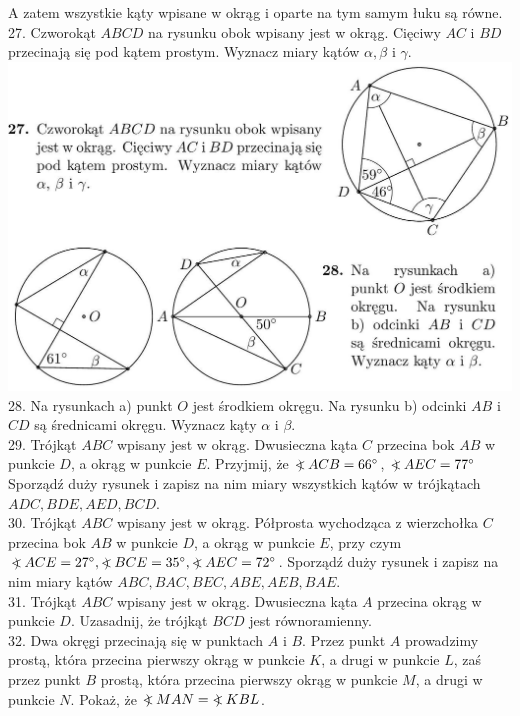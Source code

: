 \documentclass[10pt]{article}
\newcommand\Varangle{\mathop{{<\!\!\!\!\!\text{\small)}}\:}\nolimits}
\begin{document}
A zatem wszystkie kąty wpisane w okrąg i oparte na tym samym łuku są równe.\\
27. Czworokąt \(A B C D\) na rysunku obok wpisany jest w okrąg. Cięciwy \(A C\) i \(B D\) przecinają się pod kątem prostym. Wyznacz miary kątów \(\alpha, \beta\) i \(\gamma\).\\
\includegraphics[max width=\textwidth, center]{2024_11_21_71f62bd117d375398909g-187(1)}\\
28. Na rysunkach a) punkt \(O\) jest środkiem okręgu. Na rysunku b) odcinki \(A B\) i \(C D\) są średnicami okręgu. Wyznacz kąty \(\alpha\) i \(\beta\).\\
29. Trójkąt \(A B C\) wpisany jest w okrąg. Dwusieczna kąta \(C\) przecina bok \(A B\) w punkcie \(D\), a okrąg w punkcie \(E\). Przyjmij, że \(\Varangle A C B=66^{\circ}\), \(\Varangle A E C=77^{\circ}\) Sporządź duży rysunek i zapisz na nim miary wszystkich kątów w trójkątach \(A D C, B D E, A E D, B C D\).\\
30. Trójkąt \(A B C\) wpisany jest w okrąg. Półprosta wychodząca z wierzchołka \(C\) przecina bok \(A B\) w punkcie \(D\), a okrąg w punkcie \(E\), przy czym \(\Varangle A C E=27^{\circ}, \Varangle B C E=35^{\circ}, \Varangle A E C=72^{\circ}\). Sporządź duży rysunek i zapisz na nim miary kątów \(A B C, B A C, B E C, A B E, A E B, B A E\).\\
31. Trójkąt \(A B C\) wpisany jest w okrąg. Dwusieczna kąta \(A\) przecina okrąg w punkcie \(D\). Uzasadnij, że trójkąt \(B C D\) jest równoramienny.\\
32. Dwa okręgi przecinają się w punktach \(A\) i \(B\). Przez punkt \(A\) prowadzimy prostą, która przecina pierwszy okrąg w punkcie \(K\), a drugi w punkcie \(L\), zaś przez punkt \(B\) prostą, która przecina pierwszy okrąg w punkcie \(M\), a drugi w punkcie \(N\). Pokaż, że \(\Varangle M A N=\Varangle K B L\).
\end{document}
